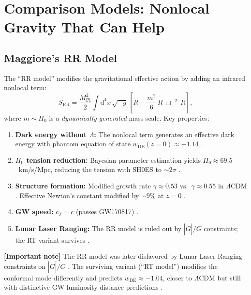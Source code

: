 \documentclass[11pt,a4paper]{article}
\theoremstyle{plain}
\theoremstyle{definition}
\theoremstyle{remark}
\renewcommand{\dd}{\mathrm{d}}
\newcommand{\signcorrection}[1]{%
  \par\smallskip\noindent
  \colorbox{red!10}{\parbox{\dimexpr\linewidth-2\fboxsep}{%
    \textcolor{red!60!black}{\textbf{[Important note]}} #1}}%
  \par\smallskip}
\begin{document}
\section{Comparison Models: Nonlocal Gravity That Can Help}
\label{sec:comparison}

\subsection{Maggiore's RR Model}

The ``RR model'' \cite{MaggioreMancarella14, Belgacem18} modifies the
gravitational effective action by adding an infrared nonlocal term:
\begin{equation}\label{eq:RR-model}
  S_{\mathrm{RR}} = \frac{M_{\mathrm{Pl}}^2}{2}
  \int \dd^4 x\,\sqrt{-g}\,
  \left[R - \frac{m^2}{6}\,R\,\Box^{-2}\,R\right],
\end{equation}
where $m \sim H_0$ is a \emph{dynamically generated} mass scale. Key
properties:

\begin{enumerate}[nosep]
  \item \textbf{Dark energy without $\Lambda$:} The nonlocal term
    generates an effective dark energy with phantom equation of state
    $w_{\mathrm{DE}}(z=0) \approx -1.14$ \cite{Belgacem18}.
  \item \textbf{$H_0$ tension reduction:} Bayesian parameter estimation
    yields $H_0 \approx 69.5$~km/s/Mpc, reducing the tension with
    SH0ES to $\sim 2\sigma$ \cite{Belgacem18}.
  \item \textbf{Structure formation:} Modified growth rate
    $\gamma \approx 0.53$ vs.\ $\gamma \approx 0.55$ in $\Lambda$CDM
    \cite{Dirian14}. Effective Newton's constant modified by
    $\sim 9\%$ at $z = 0$ \cite{Dirian14}.
  \item \textbf{GW speed:} $c_T = c$ (passes GW170817) \cite{Belgacem18}.
  \item \textbf{Lunar Laser Ranging:} The RR model is ruled out by
    $|\dot{G}|/G$ constraints; the RT variant survives
    \cite{Belgacem19LLR}.
\end{enumerate}

\signcorrection{The RR model was later disfavored by Lunar Laser
Ranging constraints on $|\dot{G}|/G$ \cite{Belgacem19LLR}. The
surviving variant (``RT model'') modifies the conformal mode differently
and predicts $w_{\mathrm{DE}} \approx -1.04$, closer to $\Lambda$CDM
but still with distinctive GW luminosity distance predictions
\cite{Belgacem19GW}.}
\end{document}
